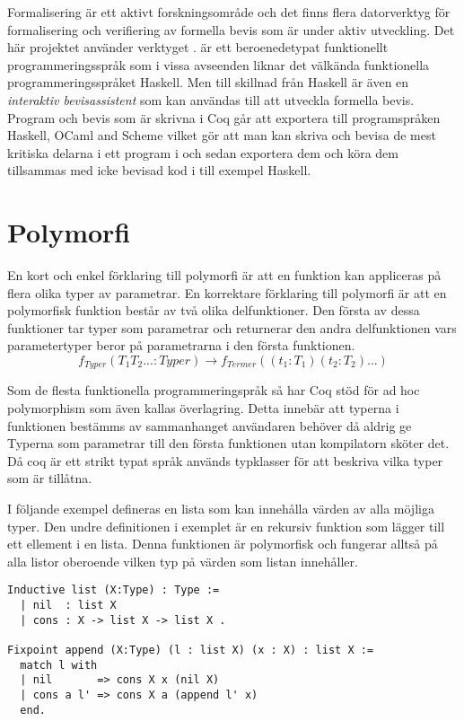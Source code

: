 Formalisering är ett aktivt forskningsområde och det finns flera datorverktyg
för formalisering och verifiering av formella bevis som är under aktiv
utveckling. Det här projektet använder verktyget \coq. \coq är ett
beroenedetypat funktionellt programmeringsspråk som i vissa avseenden liknar
det välkända funktionella programmeringsspråket Haskell. Men till skillnad från
Haskell är \coq även en \emph{interaktiv bevisassistent} som kan användas till
att utveckla formella bevis. Program och bevis som är skrivna i Coq går att
exportera till programspråken Haskell, OCaml and Scheme vilket gör att man kan
skriva och bevisa de mest kritiska delarna i ett program i \coq och sedan
exportera dem och köra dem tillsammas med icke bevisad kod i till exempel
Haskell.

\section{Polymorfi}
En kort och enkel förklaring till polymorfi är att en funktion kan appliceras
på flera olika typer av parametrar. En korrektare förklaring till polymorfi är
att en polymorfisk funktion består av två olika delfunktioner. Den första av
dessa funktioner tar typer som parametrar och returnerar den andra
delfunktionen vars parametertyper beror på parametrarna i den första
funktionen.
\begin{equation}
  f_{Typer}(T_1 T_2 ... : Typer) \rightarrow f_{Termer}((t_1 : T_1) (t_2 : T_2) ...)
\end{equation}

Som de flesta funktionella programmeringspråk så har Coq stöd för ad hoc
polymorphism som även kallas överlagring. Detta innebär att typerna i
funktionen bestämms av sammanhanget användaren behöver då aldrig ge Typerna som
parametrar till den första funktionen utan kompilatorn sköter det. Då coq är
ett strikt typat språk används typklasser för att beskriva vilka typer som är
tillåtna.

I följande exempel defineras en lista som kan innehålla värden av alla möjliga
typer. Den undre definitionen i exemplet är en rekursiv funktion som lägger
till ett ellement i en lista. Denna funktionen är polymorfisk och fungerar
alltså på alla listor oberoende vilken typ på värden som listan innehåller.
\begin{lstlisting}
Inductive list (X:Type) : Type :=
  | nil  : list X
  | cons : X -> list X -> list X .

Fixpoint append (X:Type) (l : list X) (x : X) : list X :=
  match l with
  | nil       => cons X x (nil X)
  | cons a l' => cons X a (append l' x)
  end.
\end{lstlisting}

